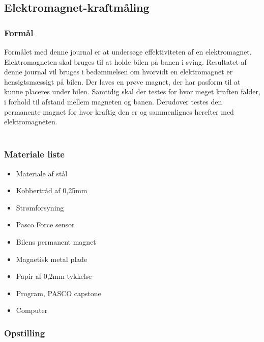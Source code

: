 \subsection{Elektromagnet-kraftmåling}\label{bilag_elektromagnet}
\label{Elektrojournal}
\subsubsection*{Formål}
Formålet med denne journal er at undersøge effektiviteten af en elektromagnet. Elektromagneten skal bruges til at holde bilen på banen i sving. Resultatet af denne journal vil bruges i bedømmelsen om hvorvidt en elektromagnet er hensigtsmæssigt på bilen. Der laves en prøve magnet, der har pasform til at kunne placeres under bilen. Samtidig skal der testes for hvor meget kraften falder, i forhold til afstand mellem magneten og banen. Derudover testes den permanente magnet for hvor kraftig den er og sammenlignes herefter med elektromagneten.\\
\\
\subsubsection*{Materiale liste}
\begin{itemize}
	\item Materiale af stål
	\item Kobbertråd af 0,25mm
	\item Strømforsyning
	\item Pasco Force sensor
	\item Bilens permanent magnet
	\item Magnetisk metal plade
	\item Papir af 0,2mm tykkelse
	\item Program, PASCO capstone
	\item Computer
\end{itemize}
 
\subsubsection*{Opstilling}

